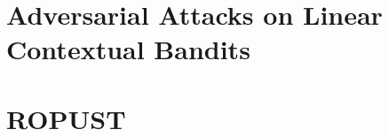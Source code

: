 \begin{appendices}

% 


    
    

\chapter{Adversarial Attacks on Linear Contextual Bandits}
\label{paper:banditsattacks}






\chapter{ROPUST}
\label{paper:ropust}




% 



% 


% 

% 

% 

\end{appendices}
